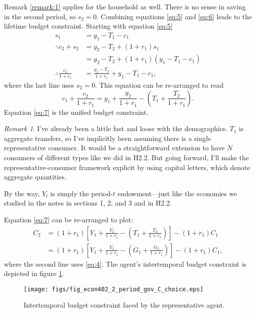 \documentclass[12pt]{pracjourn_rwr}
\theoremstyle{remark}
\newtheorem{remark}{Remark}
\begin{document}
Remark \ref{remark:1} applies for the household as well.
There is no sense in saving in the second period, so $s_{2} = 0$.
Combining equations \eqref{eq:5} and \eqref{eq:6} leads to the lifetime budget constraint.
Starting with equation \eqref{eq:5}
\begin{align*}
s_{1} &= y_{1} - T_{1} - c_{1} \\
\therefore c_{2} + s_{2} &= y_{2} - T_{2} + (1+r_{1})s_{1} \\
&= y_{2} - T_{2} + (1+r_{1}) \left( y_{1} - T_{1} - c_{1} \right) \\
\therefore \frac{c_{2}}{1+r_{1}} &= \frac{y_{2} - T_{2}}{1+r_{1}} + y_{1} - T_{1} - c_{1},
\end{align*}
where the last line uses $s_{2} = 0$.
This equation can be re-arranged to read
\begin{equation}
\label{eq:7}
c_{1} + \frac{c_{2}}{1+r_{1}} = y_{1} + \frac{y_{2}}{1+r_{1}} - \left( T_{1} + \frac{T_{2}}{1+r_{1}} \right).
\end{equation}
Equation \eqref{eq:7} is the unified budget constraint.

\begin{remark}
\label{remark:2}
I've already been a little fast and loose with the demographics.
$T_{1}$ is aggregate transfers,
so I've implicitly been assuming there is a single representative consumer.
It would be a straightforward extension to have $N$ consumers of different types like we did in H2.2.
But going forward, I'll make the representative-consumer framework explicit by using capital letters,
which denote aggregate quantities.

By the way,
$Y_{t}$ is simply the period-$t$ endowment---just like the economies we studied in the notes in sections 1, 2, and 3 and in
H2.2.
\end{remark}

Equation \eqref{eq:7} can be re-arranged to plot:
\begin{align*}
C_{2} &= (1+r_{1})\left[ Y_{1} + \frac{Y_{2}}{1+r_{1}} - \left( T_{1} + \frac{T_{2}}{1+r_{1}} \right) \right] - (1+r_{1})C_{1} \\
&= (1+r_{1})\left[ Y_{1} + \frac{Y_{2}}{1+r_{1}} - \left( G_{1} + \frac{G_{2}}{1+r_{1}} \right) \right] - (1+r_{1})C_{1},
\end{align*}
where the second line uses \eqref{eq:4}.
The agent's intertemporal budget constraint is depicted in figure \ref{fig:C-choice}.

\begin{figure}[htbp]
\centerline{\texttt{[image: figs/fig\_econ402\_2\_period\_gov\_C\_choice.eps]}}
\caption[]{\label{fig:C-choice} Intertemporal budget constraint faced by the representative agent.}
\end{figure}
\end{document}
